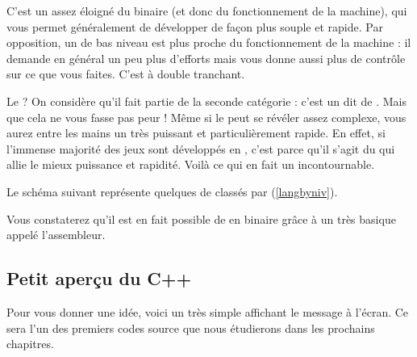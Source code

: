 C'est un \lang assez éloigné du binaire (et donc du fonctionnement de la machine), qui vous permet généralement de développer de façon plus souple et rapide.
Par opposition, un \lang de bas niveau est plus proche du fonctionnement de la machine : il demande en général un peu plus d'efforts mais vous donne aussi plus de contrôle sur ce que vous faites. C'est à double tranchant.

Le \cplus ? On considère qu'il fait partie de la seconde catégorie : c'est un \lang dit  de . Mais que cela ne vous fasse pas peur ! Même si le \cplus peut se révéler assez complexe, vous aurez entre les mains un \lang très puissant et particulièrement rapide. En effet, si l'immense majorité des jeux sont développés en \cplus, c'est parce qu'il s'agit du \lang qui allie le mieux puissance et rapidité. Voilà ce qui en fait un \lang incontournable.

Le schéma suivant représente quelques \langs de \progio classés par   (\fig \ref{langbyniv}).

Vous constaterez qu'il est en fait possible de \progrer en binaire grâce à un \lang très basique appelé l'assembleur.

\subsection{Petit aperçu du C++}
Pour vous donner une idée, voici un \prog très simple affichant le message  à l'écran. Ce sera l'un des premiers codes source que nous étudierons dans les prochains chapitres.


